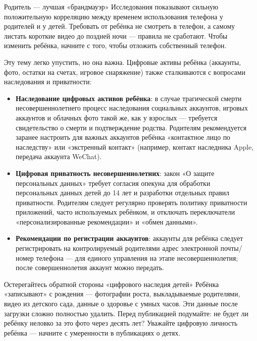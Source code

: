 \begin{tcbinfo}{Родитель — лучшая «брандмауэр»}
Исследования показывают сильную положительную корреляцию между временем использования телефона у родителей и у детей. Требовать от ребёнка не смотреть в телефон, а самому листать короткие видео до поздней ночи — правила не сработают. Чтобы изменить ребёнка, начните с того, чтобы отложить собственный телефон.

\end{tcbinfo}


Эту тему легко упустить, но она важна. Цифровые активы ребёнка (аккаунты, фото, остатки на счетах, игровое снаряжение) также сталкиваются с вопросами наследования и приватности:

\begin{itemize}
  \item \textbf{Наследование цифровых активов ребёнка}: в случае трагической смерти несовершеннолетнего процесс наследования социальных аккаунтов, игровых аккаунтов и облачных фото такой же, как у взрослых — требуется свидетельство о смерти и подтверждение родства. Родителям рекомендуется заранее настроить для важных аккаунтов ребёнка «контактное лицо по наследству» или «экстренный контакт» (например, контакт наследника Apple, передача аккаунта WeChat).
  \item \textbf{Цифровая приватность несовершеннолетних}: закон «О защите персональных данных» требует согласия опекуна для обработки персональных данных детей до 14 лет и разработки отдельных правил приватности. Родителям следует регулярно проверять политику приватности приложений, часто используемых ребёнком, и отключать переключатели «персонализированные рекомендации» и «обмен данными».
  \item \textbf{Рекомендации по регистрации аккаунтов}: аккаунты для ребёнка следует регистрировать на контролируемый родителями адрес электронной почты/номер телефона — для единого управления на этапе несовершеннолетия; после совершеннолетия аккаунт можно передать.
\end{itemize}

\begin{tcbwarn}{Остерегайтесь обратной стороны «цифрового наследия детей»}
Ребёнка «записывают» с рождения — фотографии роста, выкладываемые родителями, видео из детского сада, данные о здоровье с умных часов. Эти данные после загрузки сложно полностью удалить. Перед публикацией подумайте: не будет ли ребёнку неловко за это фото через десять лет? Уважайте цифровую личность ребёнка — начните с умеренности в публикациях о детях.

\end{tcbwarn}


